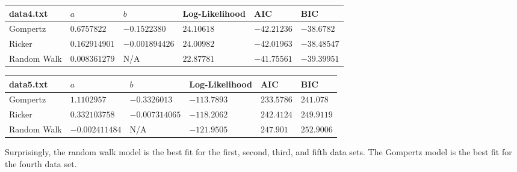 \documentclass{article} %
\theoremstyle{plain}
\numberwithin{equation}{section} %
\numberwithin{figure}{section} %
\numberwithin{table}{section} %
\begin{document}
\begin{table}[ht!]
    \begin{tabular}{||l||l|l|l|l|l||}\hline\hline
        data4.txt   & $a$ & $b$ & Log-Likelihood & AIC & BIC \\\hline\hline
        Gompertz    & $0.6757822$ & $-0.1522380$ & $24.10618$ & $-42.21236$ & $-38.6782$ \\\hline
        Ricker      & $0.162914901$ & $-0.001894426$ & $24.00982$ & $-42.01963$ & $-38.48547$ \\\hline
        Random Walk & $0.008361279$ & N/A & $22.87781$ & $-41.75561$ & $-39.39951$ \\\hline\hline
    \end{tabular}
\end{table}

\begin{table}[ht!]
    \begin{tabular}{||l||l|l|l|l|l||}\hline\hline
        data5.txt   & $a$ & $b$ & Log-Likelihood & AIC & BIC \\\hline\hline
        Gompertz    & $1.1102957$ & $-0.3326013$ & $-113.7893$ & $233.5786$ & $241.078$ \\\hline
        Ricker      & $0.332103758$ & $-0.007314065$ & $-118.2062$ & $242.4124$ & $249.9119$ \\\hline
        Random Walk & $-0.002411484$ & N/A & $-121.9505$ & $247.901$ & $252.9006$ \\\hline\hline
    \end{tabular}
\end{table}

Surprisingly, the random walk model is the best fit for the first, second, third, and fifth data sets.  The Gompertz model is the best fit for the fourth data set.
\end{document}
